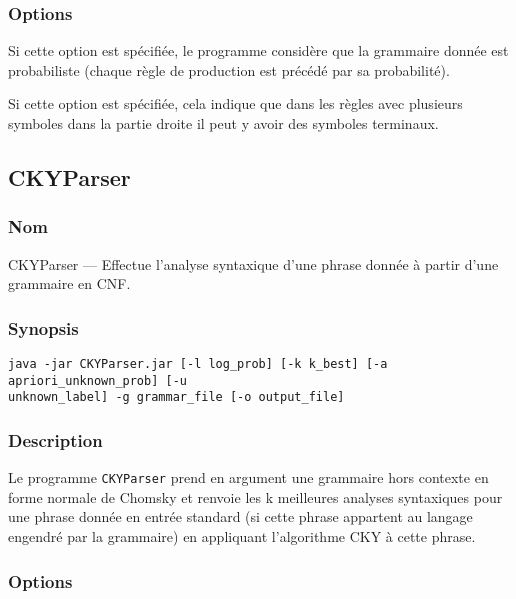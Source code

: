 \documentclass[12pt]{article}
\begin{document}
\subsubsection{Options}

\begin{description}[style=nextline]
\item[\texttt{-p, --prob}] Si cette option est sp\'ecifi\'ee, le programme consid\`ere
que la grammaire donn\'ee est probabiliste (chaque r\`egle de production est
pr\'ec\'ed\'e par sa probabilit\'e).
\item[\texttt{-t, --term\_droite}] Si cette option est sp\'ecifi\'ee, cela
indique que dans les r\`egles avec plusieurs symboles dans la partie
droite il peut y avoir des symboles terminaux.
\end{description}

\subsection{CKYParser}
\subsubsection{Nom}

CKYParser --- Effectue l'analyse syntaxique d'une phrase donn\'ee \`a partir d'une
grammaire en CNF.

\subsubsection{Synopsis}

{\ttfamily
\begin{verbatim}
java -jar CKYParser.jar [-l log_prob] [-k k_best] [-a apriori_unknown_prob] [-u
unknown_label] -g grammar_file [-o output_file]
\end{verbatim}
}

\subsubsection{Description}

Le programme \texttt{CKYParser} prend en argument une grammaire hors contexte
en forme normale de Chomsky et renvoie les k meilleures analyses syntaxiques
pour une phrase donn\'ee en entr\'ee standard (si cette phrase appartent au langage
engendr\'e par la grammaire) en appliquant l'algorithme CKY \`a cette phrase.

\subsubsection{Options}
\end{document}
